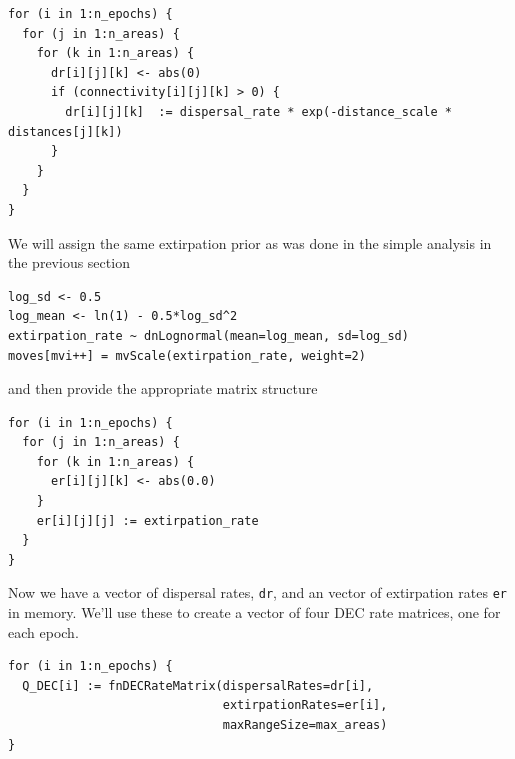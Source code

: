 \begin{snugshade}
\begin{lstlisting}
for (i in 1:n_epochs) {
  for (j in 1:n_areas) {
    for (k in 1:n_areas) {
      dr[i][j][k] <- abs(0)
      if (connectivity[i][j][k] > 0) {
        dr[i][j][k]  := dispersal_rate * exp(-distance_scale * distances[j][k])
      }
    }
  }
}
\end{lstlisting}
\end{snugshade}




We will assign the same extirpation prior as was done in the simple analysis in the previous section

\begin{snugshade}
\begin{lstlisting}
log_sd <- 0.5
log_mean <- ln(1) - 0.5*log_sd^2
extirpation_rate ~ dnLognormal(mean=log_mean, sd=log_sd)
moves[mvi++] = mvScale(extirpation_rate, weight=2)
\end{lstlisting}
\end{snugshade}

and then provide the appropriate matrix structure

\begin{snugshade}
\begin{lstlisting}
for (i in 1:n_epochs) {
  for (j in 1:n_areas) {
    for (k in 1:n_areas) {
      er[i][j][k] <- abs(0.0) 
    }
    er[i][j][j] := extirpation_rate
  }
}
\end{lstlisting}
\end{snugshade}

Now we have a vector of dispersal rates, {\tt dr}, and an vector of extirpation rates {\tt er} in memory.
We'll use these to create a vector of four DEC rate matrices, one for each epoch.

\begin{snugshade}
\begin{lstlisting}
for (i in 1:n_epochs) {
  Q_DEC[i] := fnDECRateMatrix(dispersalRates=dr[i],
                              extirpationRates=er[i],
                              maxRangeSize=max_areas)
}
\end{lstlisting}
\end{snugshade}

